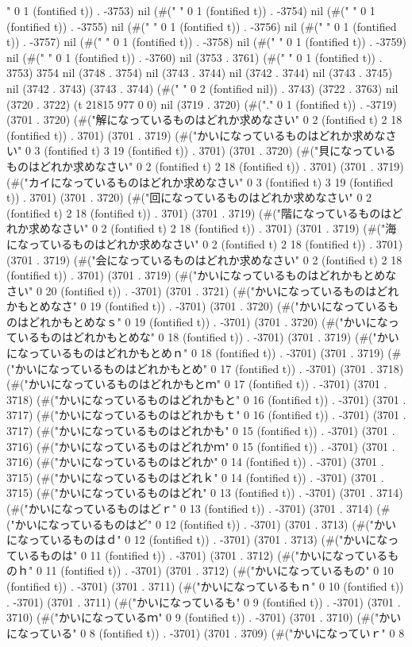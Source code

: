 " 0 1 (fontified t)) . -3753) nil (#(" " 0 1 (fontified t)) . -3754) nil (#(" " 0 1 (fontified t)) . -3755) nil (#(" " 0 1 (fontified t)) . -3756) nil (#(" " 0 1 (fontified t)) . -3757) nil (#(" " 0 1 (fontified t)) . -3758) nil (#(" " 0 1 (fontified t)) . -3759) nil (#(" " 0 1 (fontified t)) . -3760) nil (3753 . 3761) (#(" " 0 1 (fontified t)) . 3753) 3754 nil (3748 . 3754) nil (3743 . 3744) nil (3742 . 3744) nil (3743 . 3745) nil (3742 . 3743) (3743 . 3744) (#("  " 0 2 (fontified nil)) . 3743) (3722 . 3763) nil (3720 . 3722) (t 21815 977 0 0) nil (3719 . 3720) (#("." 0 1 (fontified t)) . -3719) (3701 . 3720) (#("解になっているものはどれか求めなさい" 0 2 (fontified t) 2 18 (fontified t)) . 3701) (3701 . 3719) (#("かいになっているものはどれか求めなさい" 0 3 (fontified t) 3 19 (fontified t)) . 3701) (3701 . 3720) (#("貝になっているものはどれか求めなさい" 0 2 (fontified t) 2 18 (fontified t)) . 3701) (3701 . 3719) (#("カイになっているものはどれか求めなさい" 0 3 (fontified t) 3 19 (fontified t)) . 3701) (3701 . 3720) (#("回になっているものはどれか求めなさい" 0 2 (fontified t) 2 18 (fontified t)) . 3701) (3701 . 3719) (#("階になっているものはどれか求めなさい" 0 2 (fontified t) 2 18 (fontified t)) . 3701) (3701 . 3719) (#("海になっているものはどれか求めなさい" 0 2 (fontified t) 2 18 (fontified t)) . 3701) (3701 . 3719) (#("会になっているものはどれか求めなさい" 0 2 (fontified t) 2 18 (fontified t)) . 3701) (3701 . 3719) (#("かいになっているものはどれかもとめなさい" 0 20 (fontified t)) . -3701) (3701 . 3721) (#("かいになっているものはどれかもとめなさ" 0 19 (fontified t)) . -3701) (3701 . 3720) (#("かいになっているものはどれかもとめなｓ" 0 19 (fontified t)) . -3701) (3701 . 3720) (#("かいになっているものはどれかもとめな" 0 18 (fontified t)) . -3701) (3701 . 3719) (#("かいになっているものはどれかもとめｎ" 0 18 (fontified t)) . -3701) (3701 . 3719) (#("かいになっているものはどれかもとめ" 0 17 (fontified t)) . -3701) (3701 . 3718) (#("かいになっているものはどれかもとｍ" 0 17 (fontified t)) . -3701) (3701 . 3718) (#("かいになっているものはどれかもと" 0 16 (fontified t)) . -3701) (3701 . 3717) (#("かいになっているものはどれかもｔ" 0 16 (fontified t)) . -3701) (3701 . 3717) (#("かいになっているものはどれかも" 0 15 (fontified t)) . -3701) (3701 . 3716) (#("かいになっているものはどれかｍ" 0 15 (fontified t)) . -3701) (3701 . 3716) (#("かいになっているものはどれか" 0 14 (fontified t)) . -3701) (3701 . 3715) (#("かいになっているものはどれｋ" 0 14 (fontified t)) . -3701) (3701 . 3715) (#("かいになっているものはどれ" 0 13 (fontified t)) . -3701) (3701 . 3714) (#("かいになっているものはどｒ" 0 13 (fontified t)) . -3701) (3701 . 3714) (#("かいになっているものはど" 0 12 (fontified t)) . -3701) (3701 . 3713) (#("かいになっているものはｄ" 0 12 (fontified t)) . -3701) (3701 . 3713) (#("かいになっているものは" 0 11 (fontified t)) . -3701) (3701 . 3712) (#("かいになっているものｈ" 0 11 (fontified t)) . -3701) (3701 . 3712) (#("かいになっているもの" 0 10 (fontified t)) . -3701) (3701 . 3711) (#("かいになっているもｎ" 0 10 (fontified t)) . -3701) (3701 . 3711) (#("かいになっているも" 0 9 (fontified t)) . -3701) (3701 . 3710) (#("かいになっているｍ" 0 9 (fontified t)) . -3701) (3701 . 3710) (#("かいになっている" 0 8 (fontified t)) . -3701) (3701 . 3709) (#("かいになっていｒ" 0 8 